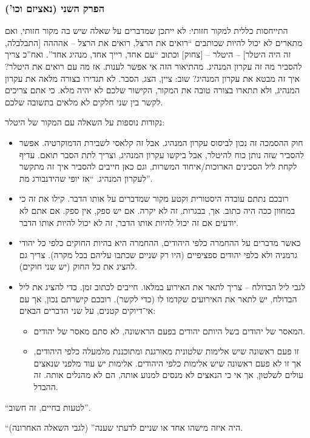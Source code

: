 \documentclass[a4paper]{book}
\begin{document}
	\subsubsection*{הפרק השני (נאציזם וכו')}
	התייחסות כללית למקור חזותי: לא ייתכן שמדברים על שאלה שיש בה מקור חזותי, ואם מתארים לא יכול להיות שכותבים ``רואים את הרצל, רואים את הרצל – אהההה [התבלבלה, זה היה היטלר] – היטלר – [צחוק] וכתוב ``עם אחד, רייך אחד, מנהיג אחד''. ואח''כ צריך להסביר מה זה עקרון המנהיג. מהתיאור הזה אי אפשר לענות. אז מה עם רואים את היטלר? איך זה מבטא את עקרון המנהיג? שוב: ציין, הצג, הסבר. לא תגדירו בצורה מלאה את עקרון המנהיג, ולא תתארו בצורה טובה את המקור, הקישור שלכם לא יהיה מלא. כי אתם צריכים לקשר בין שני חלקים לא מלאים בתשובה שלכם. 
	
	נקודות נוספות על השאלה עם המקור של היטלר: 
	\begin{itemize}
		\item חוק ההסמכה זה נכון לביסוס עקרון המנהיג. אבל זה קלאסי לשבירת הדמוקרטיה. אפשר להסביר שזה נותן כוח להיטלר, אבל ביקשו עקרון המנהיג, וצריך לתת הסבר תואם. עדיף לקחת ליל הסכינים הארוכות/איחוד המשרות, וגם כאן חייבים להסביר איך זה מתקשר לעקרון המנהיג. ``אז יופי שהידנבורג מת''. 
		\item 
		רובכם נתתם עובדה היסטורית וקטע מקור שמדברים על אותו הדבר. קילו את זה כי במחוון ככה היה כתוב. אך, בבגרות, זה לא יקרה. אם יש ספק, אין ספק. אם אתם לא יודעים אם זה יכול להיות אותו הדבר, זה לא יכול להיות אותו הדבר. 
		\item כאשר מדברים על ההחמרה כלפי היהודים, ההחמרה היא בהיות החוקים כלפי כל יהודי גרמניה ולא כלפי יהודים ספציפיים (היו רק שניים שכתבו עליהם בכל מקרה). צריך גם להציג את כל החוק (יש שני חוקים). 
		\item לגבי ליל הבדולח – צריך לתאר את האירוע במלאו. חייבים לכתוב זמן. כדי להציג את ליל הבדולח, יש לתאר את האירועים שקדמו לו (כדי לקשר). רובכם קישרתם נכון, אך עם אי־דיוקים קטנים, על שני הדברים הבאים: 
		\begin{itemize}
			\item המאסר של יהודים בשל היותם יהודים בפעם הראשונה, לא סתם מאסר של יהודים. 
			\item זו פעם ראשונה שיש אלימות שלטונית מאורגנת ומתוכננת מלמעלה כלפי היהודים, אך זו לא פעם ראשונה שיש אלימות כלפי היהודים. אלימות יש עוד מלפני שנאצים עולים לשלטון, אך אי כי הנאצים לא מנסים למנוע אותה, הם לא מהנלים אותה. זה ההבדל. 
		\end{itemize}
	\end{itemize}
	
	``לטעות בחיים, זה חשוב''. 
	
	``היה איזה מישהו אחד או שניים לדעתי שענה'' (לגבי השאלה האחרונה). 
	
\end{document}
